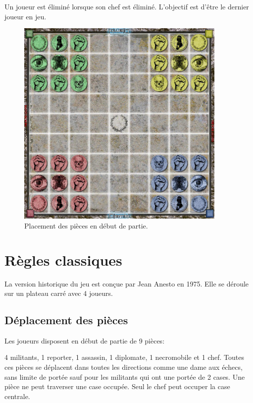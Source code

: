 \documentclass{article}
\begin{document}
Un joueur est éliminé lorsque son chef est éliminé.
L'objectif est d'être le dernier joueur en jeu.
\vspace{40pt} %

\begin{figure}[ht]
\centering
\includegraphics[width=4in,height=4in]{media/image3.png}
\caption{Placement des pièces en début de partie.}
\end{figure}

\newpage

\tableofcontents

\newpage

\section{Règles classiques}
La version historique du jeu est conçue par Jean Anesto en 1975.
Elle se déroule sur un plateau carré avec 4 joueurs.


\subsection{Déplacement des pièces}
Les joueurs disposent en début de partie de 9 pièces:

4 militants, 1 reporter, 1 assassin, 1 diplomate, 1 necromobile et 1 chef.
Toutes ces pièces se déplacent dans toutes les directions comme une dame aux échecs, sans limite de portée sauf pour les militants
qui ont une portée de 2 cases. Une pièce ne peut traverser une case occupée. Seul le chef peut occuper la case centrale.
\end{document}
